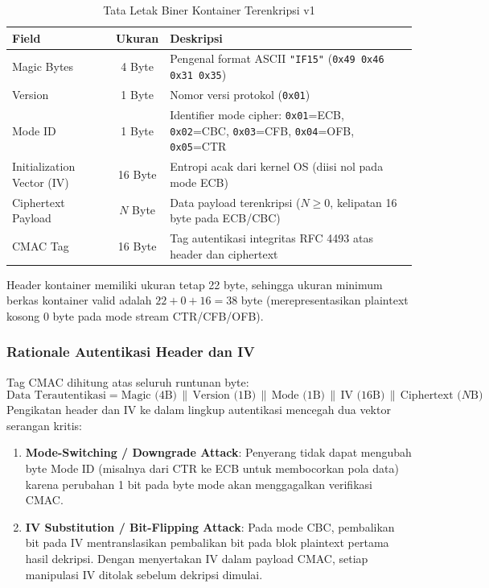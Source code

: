 \begin{table}[ht]
\centering
\caption{Tata Letak Biner Kontainer Terenkripsi v1}
\label{tab:container_layout}
\begin{tabular}{|l|c|p{8.5cm}|}
\hline
\textbf{Field} & \textbf{Ukuran} & \textbf{Deskripsi} \\
\hline
Magic Bytes & 4 Byte & Pengenal format ASCII \texttt{"IF15"} (\texttt{0x49 0x46 0x31 0x35}) \\
Version & 1 Byte & Nomor versi protokol (\texttt{0x01}) \\
Mode ID & 1 Byte & Identifier mode cipher: \texttt{0x01}=ECB, \texttt{0x02}=CBC, \texttt{0x03}=CFB, \texttt{0x04}=OFB, \texttt{0x05}=CTR \\
Initialization Vector (IV) & 16 Byte & Entropi acak dari kernel OS (diisi nol pada mode ECB) \\
Ciphertext Payload & $N$ Byte & Data payload terenkripsi ($N \ge 0$, kelipatan 16 byte pada ECB/CBC) \\
CMAC Tag & 16 Byte & Tag autentikasi integritas RFC 4493 atas header dan ciphertext \\
\hline
\end{tabular}
\end{table}

Header kontainer memiliki ukuran tetap 22 byte, sehingga ukuran minimum berkas kontainer valid adalah $22 + 0 + 16 = 38$ byte (merepresentasikan plaintext kosong 0 byte pada mode stream CTR/CFB/OFB).

\subsubsection{Rationale Autentikasi Header dan IV}
Tag CMAC dihitung atas seluruh runtunan byte:
\[
\text{Data Terautentikasi} = \text{Magic (4B)} \,\|\, \text{Version (1B)} \,\|\, \text{Mode (1B)} \,\|\, \text{IV (16B)} \,\|\, \text{Ciphertext ($N$B)}
\]
Pengikatan header dan IV ke dalam lingkup autentikasi mencegah dua vektor serangan kritis:
\begin{enumerate}
    \item \textbf{Mode-Switching / Downgrade Attack}: Penyerang tidak dapat mengubah byte Mode ID (misalnya dari CTR ke ECB untuk membocorkan pola data) karena perubahan 1 bit pada byte mode akan menggagalkan verifikasi CMAC.
    \item \textbf{IV Substitution / Bit-Flipping Attack}: Pada mode CBC, pembalikan bit pada IV mentranslasikan pembalikan bit pada blok plaintext pertama hasil dekripsi. Dengan menyertakan IV dalam payload CMAC, setiap manipulasi IV ditolak sebelum dekripsi dimulai.
\end{enumerate}

